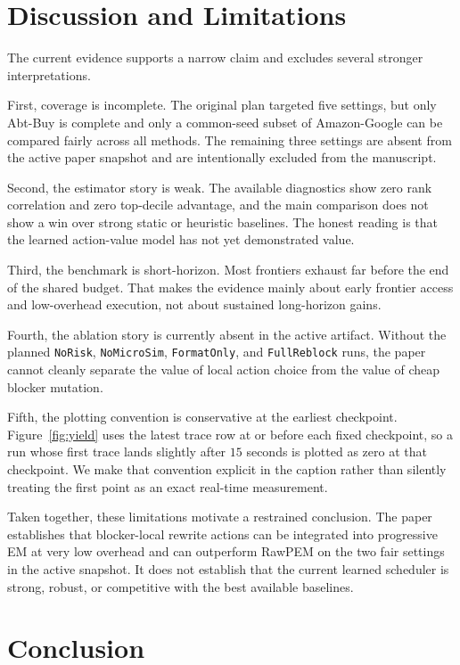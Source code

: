 \documentclass{article}
\begin{document}
\section{Discussion and Limitations}
\label{sec:limitations}

The current evidence supports a narrow claim and excludes several stronger interpretations.

First, coverage is incomplete. The original plan targeted five settings, but only Abt-Buy is complete and only a common-seed subset of Amazon-Google can be compared fairly across all methods. The remaining three settings are absent from the active paper snapshot and are intentionally excluded from the manuscript.

Second, the estimator story is weak. The available diagnostics show zero rank correlation and zero top-decile advantage, and the main comparison does not show a win over strong static or heuristic baselines. The honest reading is that the learned action-value model has not yet demonstrated value.

Third, the benchmark is short-horizon. Most frontiers exhaust far before the end of the shared budget. That makes the evidence mainly about early frontier access and low-overhead execution, not about sustained long-horizon gains.

Fourth, the ablation story is currently absent in the active artifact. Without the planned \texttt{NoRisk}, \texttt{NoMicroSim}, \texttt{FormatOnly}, and \texttt{FullReblock} runs, the paper cannot cleanly separate the value of local action choice from the value of cheap blocker mutation.

Fifth, the plotting convention is conservative at the earliest checkpoint. Figure~\ref{fig:yield} uses the latest trace row at or before each fixed checkpoint, so a run whose first trace lands slightly after $15$ seconds is plotted as zero at that checkpoint. We make that convention explicit in the caption rather than silently treating the first point as an exact real-time measurement.

Taken together, these limitations motivate a restrained conclusion. The paper establishes that blocker-local rewrite actions can be integrated into progressive EM at very low overhead and can outperform RawPEM on the two fair settings in the active snapshot. It does not establish that the current learned scheduler is strong, robust, or competitive with the best available baselines.

\section{Conclusion}
\label{sec:conclusion}
\end{document}
